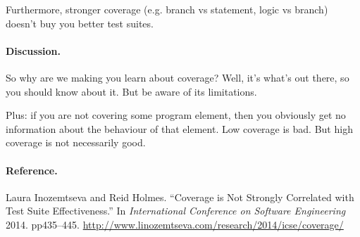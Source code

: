 \documentclass[11pt]{article}
\begin{document}
Furthermore, stronger coverage (e.g. branch vs statement, logic vs branch)
doesn't buy you better test suites.

\paragraph{Discussion.} So why are we making you learn about
coverage? Well, it's what's out there, so you should know about it.
But be aware of its limitations.

Plus: if you are not covering some program element, then you obviously
get no information about the behaviour of that element. Low coverage
is bad. But high coverage is not necessarily good.

\paragraph{Reference.} Laura Inozemtseva and Reid Holmes.
``Coverage is Not Strongly Correlated with Test Suite Effectiveness.''
In {\em International Conference on Software Engineering} 2014. pp435--445.
\url{http://www.linozemtseva.com/research/2014/icse/coverage/}




\end{document}
